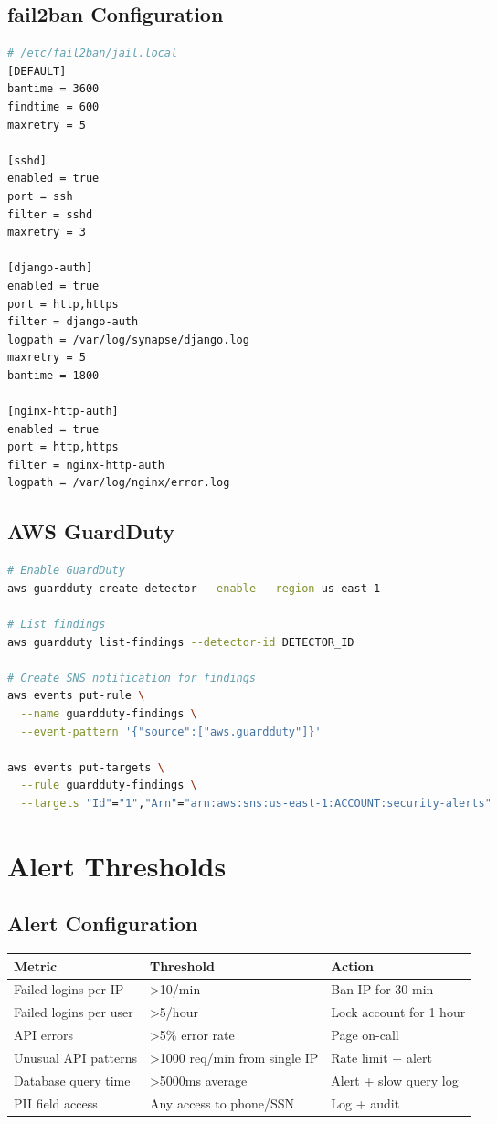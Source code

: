 \documentclass{report}
\begin{document}
\subsection{fail2ban Configuration}
\begin{lstlisting}[language=bash]
# /etc/fail2ban/jail.local
[DEFAULT]
bantime = 3600
findtime = 600
maxretry = 5

[sshd]
enabled = true
port = ssh
filter = sshd
maxretry = 3

[django-auth]
enabled = true
port = http,https
filter = django-auth
logpath = /var/log/synapse/django.log
maxretry = 5
bantime = 1800

[nginx-http-auth]
enabled = true
port = http,https
filter = nginx-http-auth
logpath = /var/log/nginx/error.log
\end{lstlisting}

\subsection{AWS GuardDuty}
\begin{lstlisting}[language=bash]
# Enable GuardDuty
aws guardduty create-detector --enable --region us-east-1

# List findings
aws guardduty list-findings --detector-id DETECTOR_ID

# Create SNS notification for findings
aws events put-rule \
  --name guardduty-findings \
  --event-pattern '{"source":["aws.guardduty"]}'

aws events put-targets \
  --rule guardduty-findings \
  --targets "Id"="1","Arn"="arn:aws:sns:us-east-1:ACCOUNT:security-alerts"
\end{lstlisting}

\section{Alert Thresholds}

\subsection{Alert Configuration}
\begin{table}[h]
\centering
\small
\begin{tabular}{|p{2.5cm}|p{2.5cm}|p{2.5cm}|}
\hline
\textbf{Metric} & \textbf{Threshold} & \textbf{Action} \\
\hline
Failed logins per IP & >10/min & Ban IP for 30 min \\
\hline
Failed logins per user & >5/hour & Lock account for 1 hour \\
\hline
API errors & >5\% error rate & Page on-call \\
\hline
Unusual API patterns & >1000 req/min from single IP & Rate limit + alert \\
\hline
Database query time & >5000ms average & Alert + slow query log \\
\hline
PII field access & Any access to phone/SSN & Log + audit \\
\hline
\end{tabular}
\end{table}
\end{document}

